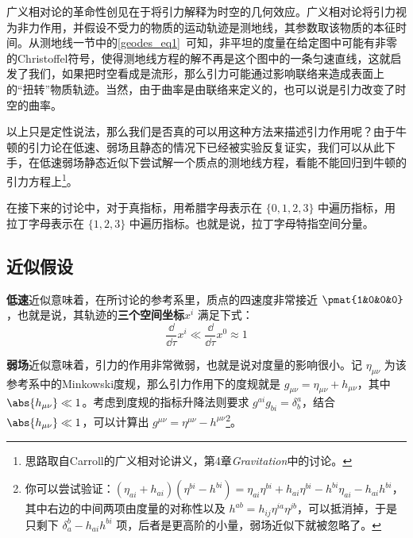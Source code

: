 

广义相对论的革命性创见在于将引力解释为时空的几何效应。广义相对论将引力视为非力作用，并假设不受力的物质的运动轨迹是测地线，其参数取该物质的本征时间。从测地线一节中的\autoref{geodes_eq1}~可知，非平坦的度量在给定图中可能有非零的Christoffel符号，使得测地线方程的解不再是这个图中的一条匀速直线，这就启发了我们，如果把时空看成是流形，那么引力可能通过影响联络来造成表面上的“扭转”物质轨迹。当然，由于曲率是由联络来定义的，也可以说是引力改变了时空的曲率。

以上只是定性说法，那么我们是否真的可以用这种方法来描述引力作用呢？由于牛顿的引力论在低速、弱场且静态的情况下已经被实验反复证实，我们可以从此下手，在低速弱场静态近似下尝试解一个质点的测地线方程，看能不能回归到牛顿的引力方程上\footnote{思路取自Carroll的广义相对论讲义\cite{CarrollGR}，第4章\textsl{Gravitation}中的讨论。}。

在接下来的讨论中，对于真指标，用希腊字母表示在 $\{0, 1, 2, 3\}$ 中遍历指标，用拉丁字母表示在 $\{1, 2, 3\}$ 中遍历指标。也就是说，拉丁字母特指空间分量。

\subsection{近似假设}

\textbf{低速}近似意味着，在所讨论的参考系里，质点的四速度非常接近 $\pmat{1&0&0&0}$，也就是说，其轨迹的\textbf{三个空间坐标}$x^i$ 满足下式：
\begin{equation}\label{WeakG_eq1}
\frac{\dd}{\dd \tau}x^i\ll \frac{\dd}{\dd \tau}x^0\approx 1
\end{equation}

\textbf{弱场}近似意味着，引力的作用非常微弱，也就是说对度量的影响很小。记 $\eta_{\mu\nu}$ 为该参考系中的Minkowski度规，那么引力作用下的度规就是 $g_{\mu\nu}=\eta_{\mu\nu}+h_{\mu\nu}$，其中 $\abs{h_{\mu\nu}}\ll 1$。考虑到度规的指标升降法则要求 $g^{ai}g_{bi}=\delta^a_b$，结合 $\abs{h_{\mu\nu}}\ll 1$，可以计算出 $g^{\mu\nu}=\eta^{\mu\nu}-h^{\mu\nu}$\footnote{你可以尝试验证：$(\eta_{ai}+h_{ai})(\eta^{bi}-h^{bi})=\eta_{ai}\eta^{bi}+h_{ai}\eta^{bi}-h^{bi}\eta_{ai}-h_{ai}h^{bi}$，其中右边的中间两项由度量的对称性以及 $h^{ab}=h_{ij}\eta^{ia}\eta^{jb}$，可以抵消掉，于是只剩下 $\delta^b_a-h_{ai}h^{bi}$ 项，后者是更高阶的小量，弱场近似下就被忽略了。}。

